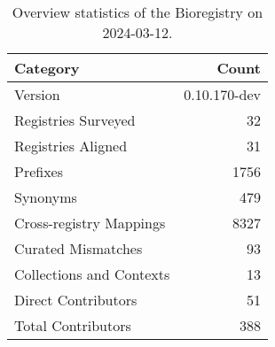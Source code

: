 \begin{table}
\caption{Overview statistics of the Bioregistry on 2024-03-12.}
\label{tab:bioregistry-summary}
\begin{tabular}{lr}
\toprule
Category & Count \\
\midrule
Version & 0.10.170-dev \\
Registries Surveyed & 32 \\
Registries Aligned & 31 \\
Prefixes & 1756 \\
Synonyms & 479 \\
Cross-registry Mappings & 8327 \\
Curated Mismatches & 93 \\
Collections and Contexts & 13 \\
Direct Contributors & 51 \\
Total Contributors & 388 \\
\bottomrule
\end{tabular}
\end{table}
